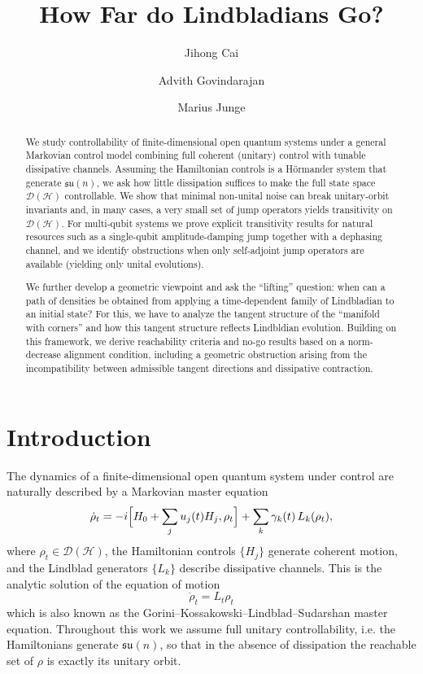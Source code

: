 \documentclass[11pt,reqno]{amsart}
\title{How Far do Lindbladians Go?}
\author{Jihong Cai}
\author{Advith Govindarajan}
\author{Marius Junge}
\theoremstyle{definition}
\newcommand{\mc}{\mathcal}
\newcommand{\mf}{\mathfrak}
\begin{document}
\maketitle
\begin{abstract}
    We study controllability of finite-dimensional open quantum systems under a general Markovian control model combining full coherent (unitary) control with tunable dissipative channels. Assuming the Hamiltonian controls is a Hörmander system that generate $\mf{su}(n)$, we ask how little dissipation suffices to make the full state space $\mc D(\mc H)$ controllable. We show that minimal non-unital noise can break unitary-orbit invariants and, in many cases, a very small set of jump operators yields transitivity on $\mc D(\mc H)$. For multi-qubit systems we prove explicit transitivity results for natural resources such as a single-qubit amplitude-damping jump together with a dephasing channel, and we identify obstructions when only self-adjoint jump operators are available (yielding only unital evolutions). 

    We further develop a geometric viewpoint and ask the ``lifting'' question: when can a path of densities be obtained from applying a time-dependent family of Lindbladian to an initial state? For this, we have to analyze the tangent structure of the ``manifold with corners'' and how this tangent structure reflects Lindbldian evolution. Building on this framework, we derive reachability criteria and no-go results based on a norm-decrease alignment condition, including a geometric obstruction arising from the incompatibility between admissible tangent directions and dissipative contraction.
\end{abstract}


\bigbreak
\setcounter{tocdepth}{2}
\tableofcontents
\vfill\newpage


\section{Introduction}
The dynamics of a finite-dimensional open quantum system under control are naturally described by a Markovian master equation
$$\dot\rho_t =-i\Bigl[H_0+\sum_j u_j(t) H_j,\rho_t\Bigr]+\sum_k \gamma_k(t)\,L_k(\rho_t),$$
where $\rho_t\in\mc D(\mc H)$, the Hamiltonian controls $\{H_j\}$ generate coherent motion, and the Lindblad generators $\{L_k\}$ describe dissipative channels.  
This is the analytic solution of the equation of motion 
$$\dot\rho_t=L_t\rho_t$$
which is also known as the Gorini–Kossakowski–Lindblad–Sudarshan master equation.
Throughout this work we assume full unitary controllability, i.e. the Hamiltonians generate $\mf{su}(n)$, so that in the absence of dissipation the reachable set of $\rho$ is exactly its unitary orbit.
\end{document}
